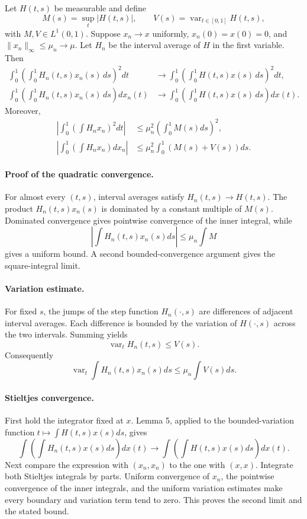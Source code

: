 \begin{lemma}[Lemma 6]
Let \(H(t,s)\) be measurable and define
\[
 M(s)=\sup_t|H(t,s)|,
 \qquad
 V(s)=\operatorname{var}_{t\in[0,1]}H(t,s),
\]
with \(M,V\in L^1(0,1)\).  Suppose \(x_n\to x\) uniformly, \(x_n(0)=x(0)=0\), and \(\|x_n\|_\infty\le\mu_n\to\mu\).  Let \(H_n\) be the interval average of \(H\) in the first variable.  Then
\begin{align*}
 \int_0^1\left(\int_0^1H_n(t,s)x_n(s)\,ds\right)^2dt
 &\to
 \int_0^1\left(\int_0^1H(t,s)x(s)\,ds\right)^2dt,\\
 \int_0^1\left(\int_0^1H_n(t,s)x_n(s)\,ds\right)dx_n(t)
 &\to
 \int_0^1\left(\int_0^1H(t,s)x(s)\,ds\right)dx(t).
\end{align*}
Moreover,
\begin{align*}
 \left|\int_0^1\left(\int H_nx_n\right)^2dt\right|
 &\le \mu_n^2\left(\int_0^1M(s)ds\right)^2,\\
 \left|\int_0^1\left(\int H_nx_n\right)dx_n\right|
 &\le \mu_n^2\int_0^1(M(s)+V(s))ds.
\end{align*}
\end{lemma}

\paragraph{Proof of the quadratic convergence.}
For almost every \((t,s)\), interval averages satisfy \(H_n(t,s)\to H(t,s)\).  The product \(H_n(t,s)x_n(s)\) is dominated by a constant multiple of \(M(s)\).  Dominated convergence gives pointwise convergence of the inner integral, while
\[
 \left|\int H_n(t,s)x_n(s)ds\right|
 \le \mu_n\int M
\]
gives a uniform bound.  A second bounded-convergence argument gives the square-integral limit.

\paragraph{Variation estimate.}
For fixed \(s\), the jumps of the step function \(H_n(\cdot,s)\) are differences of adjacent interval averages.  Each difference is bounded by the variation of \(H(\cdot,s)\) across the two intervals.  Summing yields
\[
 \operatorname{var}_tH_n(t,s)\le V(s).
\]
Consequently
\[
 \operatorname{var}_t\int H_n(t,s)x_n(s)ds
 \le \mu_n\int V(s)ds.
\]

\paragraph{Stieltjes convergence.}
First hold the integrator fixed at \(x\).  Lemma 5, applied to the bounded-variation function \(t\mapsto\int H(t,s)x(s)ds\), gives
\[
 \int\left(\int H_n(t,s)x(s)ds\right)dx(t)
 \to
 \int\left(\int H(t,s)x(s)ds\right)dx(t).
\]
Next compare the expression with \((x_n,x_n)\) to the one with \((x,x)\).  Integrate both Stieltjes integrals by parts.  Uniform convergence of \(x_n\), the pointwise convergence of the inner integrals, and the uniform variation estimates make every boundary and variation term tend to zero.  This proves the second limit and the stated bound.

